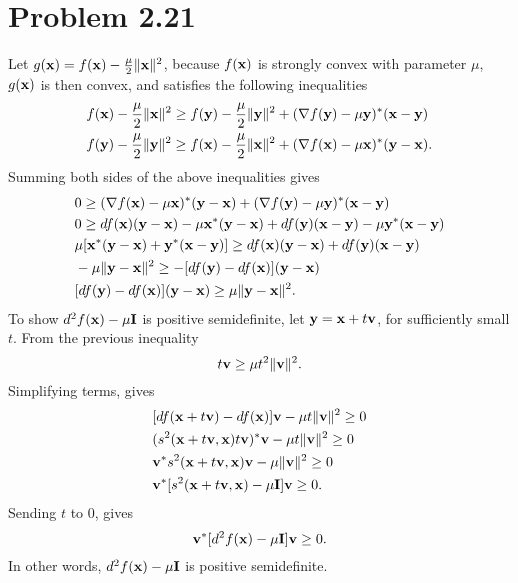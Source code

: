 \documentclass{scrartcl}
\begin{document}
\section*{Problem 2.21}

Let $g(\mathbf{x}) = f(\mathbf{x}) - {\mu \over 2} \| \mathbf{x} \| ^2$,
because $f(\mathbf{x})$ is strongly convex with parameter
$\mu$, $g(\mathbf{x})$ is then convex, and satisfies the following inequalities
\begin{equation}
	\begin{split}
		& f(\mathbf{x})-{\mu \over 2} \| \mathbf{x} \|^2
		  \ge f(\mathbf{y})-{\mu \over 2} \| \mathbf{y} \|^2
		  + (\nabla f(\mathbf{y})-\mu \mathbf{y})^*(\mathbf{x}-\mathbf{y}) \\
		& f(\mathbf{y})-{\mu \over 2} \| \mathbf{y} \|^2
		  \ge f(\mathbf{x})-{\mu \over 2} \| \mathbf{x} \|^2
		  + (\nabla f(\mathbf{x})-\mu \mathbf{x})^*(\mathbf{y}-\mathbf{x}).
	\end{split}
\end{equation}
Summing both sides of the above inequalities gives
\begin{equation}
	\begin{split}
		& 0 \ge (\nabla f(\mathbf{x})-\mu \mathbf{x})^*(\mathbf{y}-\mathbf{x})
		      + (\nabla f(\mathbf{y})-\mu \mathbf{y})^*(\mathbf{x}-\mathbf{y}) \\
		& 0 \ge df(\mathbf{x})(\mathbf{y}-\mathbf{x})-\mu \mathbf{x}^*(\mathbf{y}-\mathbf{x})	
		      + df(\mathbf{y})(\mathbf{x}-\mathbf{y})-\mu \mathbf{y}^*(\mathbf{x}-\mathbf{y}) \\
		& \mu [\mathbf{x}^*(\mathbf{y}-\mathbf{x})+\mathbf{y}^*(\mathbf{x}-\mathbf{y})]
		    \ge df(\mathbf{x})(\mathbf{y}-\mathbf{x})+df(\mathbf{y})(\mathbf{x}-\mathbf{y}) \\
		& -\mu \| \mathbf{y} - \mathbf{x} \|^2 \ge -[df(\mathbf{y})-df(\mathbf{x})](\mathbf{y}-\mathbf{x}) \\
		& [df(\mathbf{y})-df(\mathbf{x})](\mathbf{y}-\mathbf{x}) \ge \mu \| \mathbf{y} - \mathbf{x} \|^2 .
	\end{split}
\end{equation}
To show $d^2f(\mathbf{x})-\mu \mathbf{I}$ is positive semidefinite, let $\mathbf{y} = \mathbf{x}+t\mathbf{v}$,
for sufficiently small $t$. From the previous inequality
\begin{equation}
[df(\mb{x}+t\mb{v})-df(\mb{x})]t\mb{v} \ge \mu t^2 \|\mb{v}\|^2 .
\end{equation}
Simplifying terms, gives
\begin{equation}
	\begin{split}
	    & [df(\mathbf{x}+t\mathbf{v})-df(\mathbf{x})]\mathbf{v} - \mu t {\|\mathbf{v}}\|^2 \ge 0 \\
	    & (s^2(\mathbf{x}+t\mathbf{v},\mathbf{x})t\mathbf{v})^* \mathbf{v} - \mu t {\|\mathbf{v}}\|^2 \ge 0 \\
	    & \mathbf{v}^*s^2(\mathbf{x}+t\mathbf{v},\mathbf{x}) \mathbf{v} - \mu \|\mathbf{v}\|^2 \ge 0 \\
	    & \mathbf{v}^*[ s^2(\mathbf{x}+t\mathbf{v},\mathbf{x}) -\mu \mathbf{I} ] \mathbf{v} \ge 0.
	\end{split}
\end{equation}
Sending $t$ to 0, gives
\begin{equation}
	\mathbf{v}^*[ d^2f(\mathbf{x}) -\mu \mathbf{I} ] \mathbf{v} \ge 0.
\end{equation}
In other words, $d^2f(\mathbf{x})-\mu \mathbf{I}$ is positive semidefinite.
\end{document}
